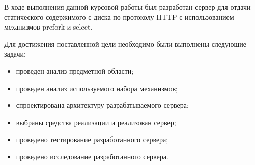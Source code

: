 
В ходе выполнения данной курсовой работы был разработан сервер для отдачи статического содержимого с диска по протоколу HTTP с использованием механизмов prefork и select.

Для достижения поставленной цели необходимо были выполнены следующие задачи:
\begin{itemize}
	\item проведен анализ предметной области;
	\item проведен анализ используемого набора механизмов;
	\item спроектирована архитектуру разрабатываемого сервера;
	\item выбраны средства реализации и реализован сервер;
	\item проведено тестирование разработанного сервера;
	\item проведено исследование разработанного сервера.
\end{itemize}